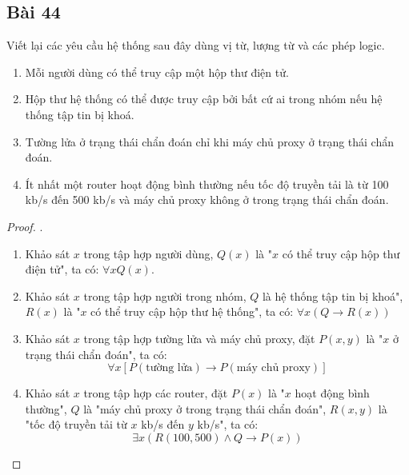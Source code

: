 \subsection*{Bài 44}
Viết lại các yêu cầu hệ thống sau đây dùng vị từ, lượng từ và các phép logic.
\begin{enumerate}[label=\alph*)]
    \item Mỗi người dùng có thể truy cập một hộp thư điện tử.
    \item Hộp thư hệ thống có thể được truy cập bởi bất cứ ai trong nhóm nếu hệ thống tập tin bị khoá.
    \item Tường lửa ở trạng thái chẩn đoán chỉ khi máy chủ proxy ở trạng thái chẩn đoán.
    \item Ít nhất một router hoạt động bình thường nếu tốc độ truyền tải là từ 100 kb/s đến 500 kb/s và máy chủ proxy không ở trong trạng thái chẩn đoán.
\end{enumerate}
\begin{proof}.
    \begin{enumerate}[label=\alph*)]
        \item Khảo sát $x$ trong tập hợp người dùng, $Q(x)$ là "$x$ có thể truy cập hộp thư điện tử", ta có: $\forall xQ(x)$.
        \item Khảo sát $x$ trong tập hợp người trong nhóm, $Q$ là hệ thống tập tin bị khoá", $R(x)$ là "$x$ có thể truy cập hộp thư hệ thống", ta có: $\forall x(Q\rightarrow R(x))$
        \item Khảo sát $x$ trong tập hợp tường lửa và máy chủ proxy, đặt $P(x,y)$ là "$x$ ở trạng thái chẩn đoán", ta có: $$\forall x[P(\text{tường lửa})\rightarrow P(\text{máy chủ proxy})]$$
        \item Khảo sát $x$ trong tập hợp các router, đặt $P(x)$ là "$x$ hoạt động bình thường", $Q$ là "máy chủ proxy ở trong trạng thái chẩn đoán", $R(x,y)$ là "tốc độ truyền tải từ $x$ kb/s đến $y$ kb/s", ta có: $$\exists x(R(100,500)\land Q\rightarrow P(x))$$
    \end{enumerate}
\end{proof}
